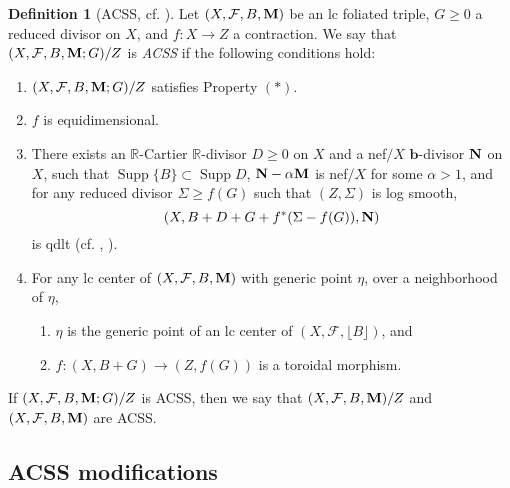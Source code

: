 \documentclass[12pt]{amsart}
\numberwithin{equation}{section}
\newcommand{\bb}{\bm{b}}
\newcommand{\Mm}{{\bf{M}}}
\newcommand{\Nn}{{\bf{N}}}
\newcommand{\Rr}{\mathbb{R}}
\newcommand{\Supp}{\operatorname{Supp}}
\newcommand{\Ff}{\mathcal{F}}
\theoremstyle{definition}
\newtheorem{defn}[thm]{Definition}
\theoremstyle{definition}
\theoremstyle{definition}
\begin{document}
\begin{defn}[ACSS, {cf. \cite[Definitions 5.4.2, 7.2.2, 7.2.3]{CHLX23}}]\label{defn: ACSS f-triple}
Let $(X,\Ff,B,\Mm)$ be an lc foliated triple, $G\geq 0$ a reduced divisor on $X$, and $f: X\rightarrow Z$ a contraction. We say that $(X,\Ff,B,\Mm;G)/Z$ is \emph{ACSS} if the following conditions hold:
\begin{enumerate}    
\item $(X,\Ff,B,\Mm;G)/Z$ satisfies Property $(\ast )$.
\item $f$ is equidimensional.
\item There exists an $\Rr$-Cartier $\Rr$-divisor $D\geq 0$ on $X$ and a nef$/X$ $\bb$-divisor $\Nn$ on $X$, such that  $\Supp\{B\}\subset\Supp D$, $\Nn-\alpha\Mm$ is nef$/X$ for some $\alpha>1$, and for any reduced divisor $\Sigma\geq f(G)$ such that $(Z,\Sigma)$ is log smooth, $$(X,B+D+G+f^\ast (\Sigma-f(G)),\Nn)$$ 
      is qdlt (cf. \cite[Definition 7.1.1]{CHLX23}, \cite[Definition 35]{dFKX17}).
\item For any lc center of $(X,\Ff,B,\Mm)$ with generic point $\eta$, over a neighborhood of $\eta$,
    \begin{enumerate}
      \item $\eta$ is the generic point of an lc center of $(X,\Ff,\lfloor B\rfloor)$, and
       \item $f: (X,B+G)\rightarrow (Z,f(G))$ is a toroidal morphism.
    \end{enumerate}
\end{enumerate}
If $(X,\Ff,B,\Mm;G)/Z$ is ACSS, then we say that $(X,\Ff,B,\Mm)/Z$ and $(X,\Ff,B,\Mm)$ are ACSS.
\end{defn}

\subsection{ACSS modifications}
\end{document}
